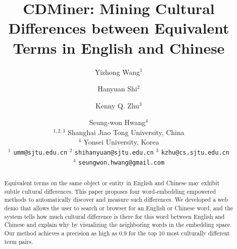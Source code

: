\documentclass[11pt]{article}
\title{CDMiner: Mining Cultural Differences between Equivalent
Terms in English and Chinese}
\author{Yizhong Wang$^1$ \and Hanyuan Shi$^2$ \and Kenny Q. Zhu$^3$ \and Seung-won Hwang$^4$\\
$^{1,2,3}$ Shanghai Jiao Tong University, China \\
$^4$ Yonsei University, Korea \\
$^1$ {\small \tt umm@sjtu.edu.cn}
$^2$ {\small \tt shihanyuan@sjtu.edu.cn}
$^3$ {\small \tt kzhu@cs.sjtu.edu.cn} \\
$^4$ {\small \tt seungwon.hwang@gmail.com}
}
\date{}
\begin{document}
\begin{CJK}{UTF8}{gbsn}
\maketitle
\begin{abstract}
Equivalent terms on the same object or entity in English and Chinese
may exhibit subtle cultural differences. 
This paper proposes four word-embedding empowered methods to 
automatically discover and measure such differences. We developed
a web demo that allows the user to search or browser for an English
or Chinese word, and the system tells how much cultural difference
is there for this word between English and Chinese and explain why
by visualizing the neighboring words in the embedding space.
Our method achieves a precision as high as 0.9 for the top 10 most
culturally different term pairs.
\end{abstract}











% 


\end{CJK}
\end{document}
